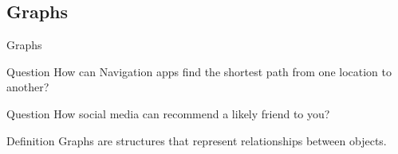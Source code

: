\documentclass[aspectratio=169]{beamer}
\begin{document}
\subsection{Graphs}
\begin{frame}{Graphs}
    \begin{exampleblock}{Question}
        How can Navigation apps find the shortest path from one location to another?
    \end{exampleblock}

    \begin{exampleblock}{Question}
        How social media can recommend a likely friend to you?
    \end{exampleblock}

    \begin{alertblock}{Definition}
        Graphs are structures that represent relationships between objects.
    \end{alertblock}
    
\end{frame}
\end{document}
